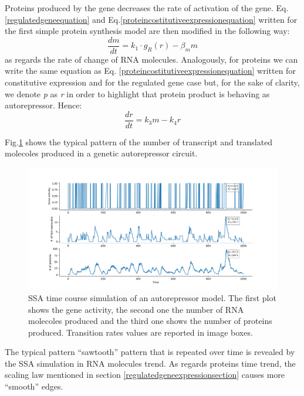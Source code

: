 \documentclass[12pt,a4paper]{report}
\begin{document}
Proteins produced by the gene decreases the rate of activation of the gene. Eq.\ref{regulatedgeneequation} and Eq.\ref{proteincostitutiveexpressionequation} written for the first simple protein synthesis model are then modified in the following way:
\begin{equation}
 \frac{dm}{dt} = k_{1} \cdot g_{R}(r) - \beta_{m}m
\end{equation}
as regards the rate of change of RNA molecules. Analogously, for proteins we can write the same equation as Eq. \ref{proteincostitutiveexpressionequation} written for constitutive expression and for the regulated gene case but, for the sake of clarity, we denote \emph{p} as \emph{r} in order to highlight that protein product is behaving as autorepressor. Hence:
\begin{equation}
 \frac{dr}{dt} = k_{3}m - k_{4}r
\end{equation}

Fig.\ref{autorepressortimeplot} shows the typical pattern of the number of transcript and translated molecoles produced in a genetic autorepressor circuit.

\begin{figure}[!ht]
\hspace*{-2.5cm} 
\includegraphics[scale=0.59]{autorepressortimeplot.png}
\caption{SSA time course simulation of an autorepressor model. The first plot shows the gene activity, the second one the number of RNA molecoles produced and the third one shows the number of proteins produced. Transition rates values are reported in image boxes.}
\label{autorepressortimeplot}
\end{figure}
\newpage
The typical pattern ``sawtooth'' pattern that is repeated over time is revealed by the SSA simulation in RNA molecules trend. As regards proteins time trend, the scaling law mentioned in section \ref{regulatedgeneexpressionsection} causes more ``smooth'' edges. 
\end{document}
